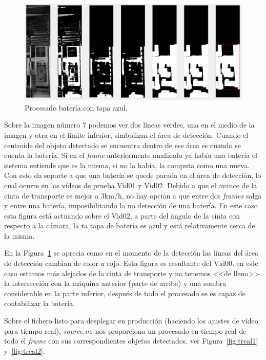 \documentclass[11pt]{memoir}
\begin{document}
\begin{center}
\begin{figure}
\includegraphics[width=\textwidth]{img/T3}
\caption{Procesado batería con tapa azul.}\label{fig:procesado3}
\end{figure}
\end{center}

Sobre la imagen número 7 podemos ver dos líneas verdes, una en el medio de la imagen y otra en el límite inferior, simbolizan el área de detección. Cuando el centroide del objeto detectado se encuentra dentro de ese área es cuando se cuenta la batería. Si en el \textit{frame} anteriormente analizado ya había una batería el sistema entiende que es la misma, si no la había, la computa como una nueva. Con esto da soporte a que una batería se quede parada en el área de detección, lo cual ocurre en los vídeos de prueba Vid01 y Vid02. Debido a que el avance de la cinta de transporte es mejor a 3km/h, no hay opción a que entre dos \textit{frames} salga y entre una batería, imposibilitando la no detección de una batería. En este caso esta figura está actuando sobre el Vid02, a parte del ángulo de la cinta con respecto a la cámara, la ta tapa de batería es azul y está relativamente cerca de la misma.

En la Figura~\ref{fig:procesado3} se aprecia como en el momento de la detección las líneas del área de detección cambian de color a rojo. Esta figura es resultante del Vid00, en este caso estamos más alejados de la cinta de transporte y no tenemos <<de lleno>> la intersección con la máquina anterior (parte de arriba) y una sombra considerable en la parte inferior, después de todo el procesado se es capaz de contabilizar la batería.

Sobre el fichero listo para desplegar en producción (haciendo los ajustes de vídeo para tiempo real), \textit{source.m}, nos proporciona un procesado en tiempo real de todo el \textit{frame} con sus correspondientes objetos detectados, ver Figura~\ref{fig:treal1} y~\ref{fig:treal2}.
\end{document}
